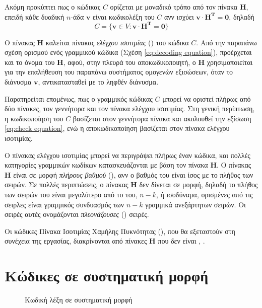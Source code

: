 Ακόμη προκύπτει πως ο κώδικας $C$ ορίζεται με μοναδικό τρόπο από τον πίνακα $\mathbf{H}$, επειδή κάθε δυαδική $n$-άδα $\mathbf{v}$ είναι κωδικολέξη του $C$ ανν
ισχύει $\mathbf{v} \cdot \mathbf{H^T} = \mathbf{0}$, δηλαδή
\begin{equation}
C=\lbrace\mathbf{v}\in V:\mathbf{v} \cdot \mathbf{H^T} = \mathbf{0}\rbrace
\label{eq:decoding equation}
\end{equation}

Ο πίνακας $\mathbf{H}$ καλείται πίνακας \textit{ελέγχου ισοτιμίας} () του κώδικα $C$. Από την παραπάνω σχέση ορισμού ενός γραμμικού κώδικα (Σχέση \ref{eq:decoding equation}), προέρχεται και το όνομα του $\mathbf{H}$, αφού, στην πλευρά του αποκωδικοποιητή, ο $\mathbf{H}$ χρησιμοποιείται για την επαλήθευση του παραπάνω συστήματος ομογενών εξισώσεων, όταν το διάνυσμα $\mathbf{v}$, αντικατασταθεί με το ληφθέν διάνυσμα.

Παρατηρείται επομένως, πως ο γραμμικός  κώδικας $C$ μπορεί να οριστεί πλήρως από δύο πίνακες, τον γεννήτορα και τον πίνακα ελέγχου ισοτιμίας. Στη γενική περίπτωση, η κωδικοποίηση του $C$ βασίζεται στον γεννήτορα πίνακα και ακολουθεί την εξίσωση \ref{eq:check equation}, ενώ η αποκωδικοποίηση βασίζεται στον πίνακα ελέγχου ισοτιμίας.

Ο πίνακας ελέγχου ισοτιμίας μπορεί να περιγράψει πλήρως έναν κώδικα, και πολλές κατηγορίες γραμμικών  κωδίκων κατασκευάζονται με βάση τον πίνακα $\mathbf{H}$. Ο πίνακας $\mathbf{H}$ είναι σε μορφή \textit{πλήρους βαθμού} (), ανν ο βαθμός του είναι ίσος με το πλήθος των σειρών. Σε πολλές περιπτώσεις, ο πίνακας $\mathbf{H}$ δεν δίνεται σε  μορφή, δηλαδή το πλήθος των σειρών του είναι μεγαλύτερο από το  του, $n-k$, ή ισοδύναμα, ορισμένες από τις σειρλες είναι γραμμικός συνδυασμός των $n-k$ γραμμικά ανεξάρτητων σειρών. Οι σειρές αυτές ονομάζονται \textit{πλεονάζουσες} () σειρές. 

Οι κώδικες Πίνακα Ισοτιμίας Χαμήλης Πυκνότητας (), που θα εξεταστούν στη συνέχεια της εργασίας, διακρίνονται από πίνακες $\mathbf{H}$ που δεν είναι  \cite{cover2012elements}, \cite{ryan2009channel}.

\section{Κώδικες σε συστηματική μορφή}

\begin{figure}[h]
\caption{Κωδική λέξη σε συστηματική μορφή}
\label{fig:systematic form}
\end{figure}

